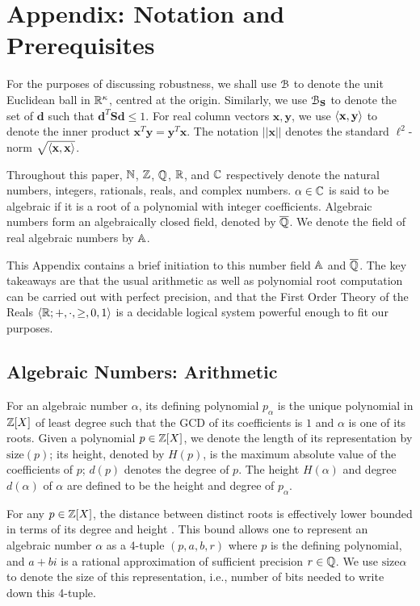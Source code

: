 \section{Appendix: Notation and Prerequisites}
\label{appendix:prelims}
For the purposes of discussing robustness, we shall use $\mathcal{B}$ to denote the unit Euclidean ball in $\mathbb{R}^\kappa$, centred at the origin. Similarly, we use $\mathcal{B}_{\mathbf{S}}$ to denote the set of $\mathbf{d}$ such that $\mathbf{d}^T\mathbf{Sd} \le 1$. For real column vectors $\mathbf{x}, \mathbf{y}$, we use $\langle\mathbf{x}, \mathbf{y}\rangle$ to denote the inner product $\mathbf{x}^T\mathbf{y} = \mathbf{y}^T\mathbf{x}$. The notation $||\mathbf{x}||$ denotes the standard $\ell^2$-norm $\sqrt{\langle\mathbf{x}, \mathbf{x}\rangle}$.

Throughout this paper,  $\mathbb{N}$, $\mathbb{Z}$, $\mathbb{Q}$, $\mathbb{R}$, and $\mathbb{C}$ respectively denote the natural numbers, integers, rationals, reals, and complex numbers. $\alpha \in \mathbb{C}$ is said to be algebraic if it is a root of a polynomial with integer coefficients. Algebraic numbers form an algebraically closed field, denoted by $\overline{\mathbb{Q}}$. We denote the field of real algebraic numbers by $\mathbb{A}$.

This Appendix contains a brief initiation to this number field $\mathbb{A}$ and $\overline{\mathbb{Q}}$. The key takeaways are that the usual arithmetic as well as polynomial root computation can be carried out with perfect precision, and that the First Order Theory of the Reals $\langle\mathbb{R}; +, \cdot, \ge, 0, 1\rangle$ is a decidable logical system powerful enough to fit our purposes.

\subsection{Algebraic Numbers: Arithmetic}
For an algebraic number $\alpha$, its defining polynomial $p_\alpha$ is the unique polynomial in $\mathbb{Z}[X]$ of least degree such that the GCD of its coefficients is $1$ and $\alpha$ is one of its roots.
Given a polynomial $p \in \mathbb{Z}[X]$, we denote the length of its representation by $\text{size}(p)$; its height, denoted by $H(p)$, is the maximum absolute value of the coefficients of $p$; $d(p)$ denotes the degree of $p$. The height $H(\alpha)$ and degree $d(\alpha)$ of $\alpha$ are defined to be the height and degree of $p_\alpha$.

For any $p \in \mathbb{Z}[X]$, the distance between distinct roots is effectively lower bounded in terms of its degree and height \cite{mignottecon}.
This bound allows one to represent an algebraic number $\alpha$ as a 4-tuple $(p,a,b,r)$ where $p$ is the defining polynomial, and $a+bi$ is a rational approximation of sufficient precision $r\in\mathbb{Q}$. We use $\text{size}{\alpha}$ to denote the size of this representation, i.e., number of bits needed to write down this 4-tuple.

